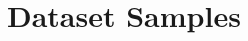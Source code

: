 \documentclass{article}
\begin{document}

\FloatBarrier
\newpage

\section{Dataset Samples}
\label{sec:datasetsamples}
\end{document}
